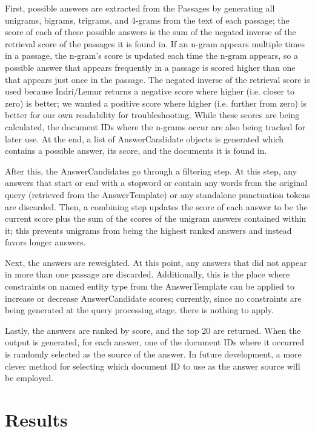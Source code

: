\documentclass[11pt]{article}
\begin{document}
First, possible answers are extracted from the Passages by generating all unigrams, bigrams, trigrams, and 4-grams from the text of each passage; the score of each of these possible answers is the sum of the negated inverse of the retrieval score of the passages it is found in.  If an n-gram appears multiple times in a passage, the n-gram's score is updated each time the n-gram appears, so a possible answer that appears frequently in a passage is scored higher than one that appears just once in the passage.  The negated inverse of the retrieval score is used because Indri/Lemur returns a negative score where higher (i.e. closer to zero) is better; we wanted a positive score where higher (i.e. further from zero) is better for our own readability for troubleshooting.  While these scores are being calculated, the document IDs where the n-grams occur are also being tracked for later use.  At the end, a list of AnswerCandidate objects is generated which contains a possible answer, its score, and the documents it is found in.

After this, the AnswerCandidates go through a filtering step.  At this step, any answers that start or end with a stopword or contain any words from the original query (retrieved from the AnswerTemplate) or any standalone punctuation tokens are discarded.  Then, a combining step updates the score of each answer to be the current score plus the sum of the scores of the unigram answers contained within it; this prevents unigrams from being the highest ranked answers and instead favors longer answers.

Next, the answers are reweighted.  At this point, any answers that did not appear in more than one passage are discarded.  Additionally, this is the place where constraints on named entity type from the AnswerTemplate can be applied to increase or decrease AnswerCandidate scores; currently, since no constraints are being generated at the query processing stage, there is nothing to apply.

Lastly, the answers are ranked by score, and the top 20 are returned.  When the output is generated, for each answer, one of the document IDs where it occurred is randomly selected as the source of the answer.  In future development, a more clever method for selecting which document ID to use as the answer source will be employed.

\section{Results}
\end{document}
